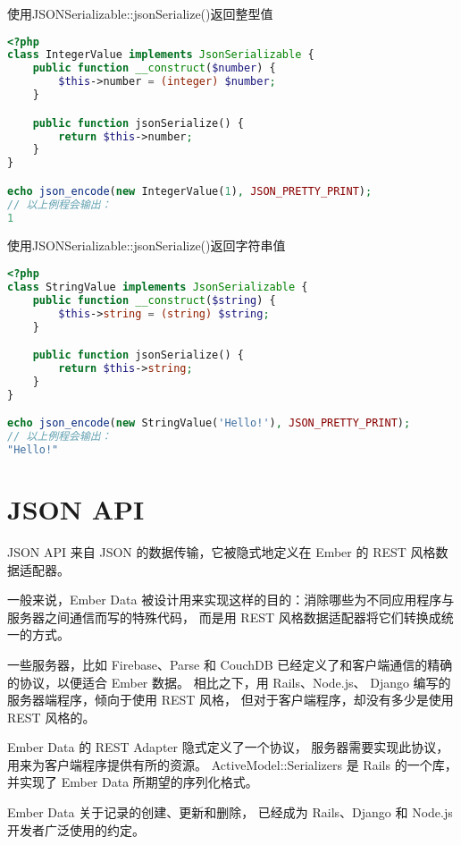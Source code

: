 \begin{example}
使用JSONSerializable::jsonSerialize()返回整型值
\begin{lstlisting}[language=PHP]
<?php
class IntegerValue implements JsonSerializable {
    public function __construct($number) {
        $this->number = (integer) $number;
    }

    public function jsonSerialize() {
        return $this->number;
    }
}

echo json_encode(new IntegerValue(1), JSON_PRETTY_PRINT);
// 以上例程会输出：
1
\end{lstlisting}
\end{example}




\begin{example}
使用JSONSerializable::jsonSerialize()返回字符串值
\begin{lstlisting}[language=PHP]
<?php
class StringValue implements JsonSerializable {
    public function __construct($string) {
        $this->string = (string) $string;
    }

    public function jsonSerialize() {
        return $this->string;
    }
}

echo json_encode(new StringValue('Hello!'), JSON_PRETTY_PRINT);
// 以上例程会输出：
"Hello!"
\end{lstlisting}
\end{example}




\chapter{JSON API}

JSON API 来自 JSON 的数据传输，它被隐式地定义在 Ember 的 REST 风格数据适配器。

一般来说，Ember Data 被设计用来实现这样的目的：消除哪些为不同应用程序与服务器之间通信而写的特殊代码， 而是用 REST 风格数据适配器将它们转换成统一的方式。

一些服务器，比如 Firebase、Parse 和 CouchDB 已经定义了和客户端通信的精确的协议，以便适合 Ember 数据。 相比之下，用 Rails、Node.js、 Django 编写的服务器端程序，倾向于使用 REST 风格， 但对于客户端程序，却没有多少是使用 REST 风格的。

Ember Data 的 REST Adapter 隐式定义了一个协议， 服务器需要实现此协议，用来为客户端程序提供有所的资源。 ActiveModel::Serializers 是 Rails 的一个库，并实现了 Ember Data 所期望的序列化格式。

Ember Data 关于记录的创建、更新和删除， 已经成为 Rails、Django 和 Node.js 开发者广泛使用的约定。

